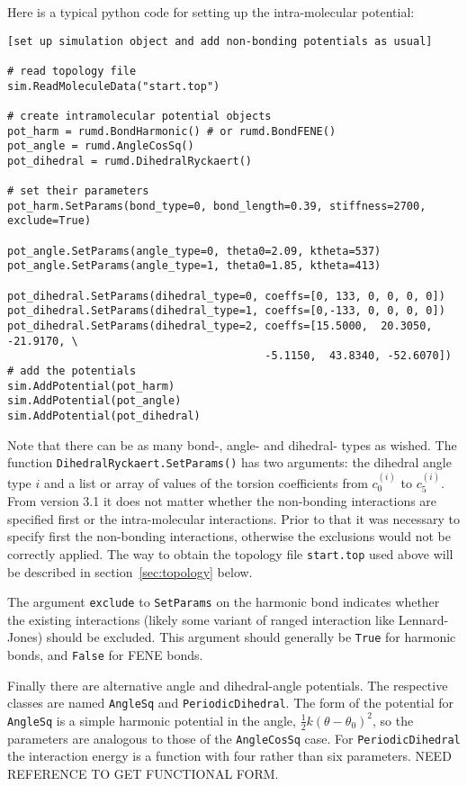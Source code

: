 \documentclass[a4paper]{article}
\begin{document}
Here is a typical python code for setting up the intra-molecular potential:
\begin{verbatim}
[set up simulation object and add non-bonding potentials as usual]

# read topology file
sim.ReadMoleculeData("start.top")

# create intramolecular potential objects
pot_harm = rumd.BondHarmonic() # or rumd.BondFENE()
pot_angle = rumd.AngleCosSq()
pot_dihedral = rumd.DihedralRyckaert()

# set their parameters
pot_harm.SetParams(bond_type=0, bond_length=0.39, stiffness=2700, exclude=True)

pot_angle.SetParams(angle_type=0, theta0=2.09, ktheta=537)
pot_angle.SetParams(angle_type=1, theta0=1.85, ktheta=413)

pot_dihedral.SetParams(dihedral_type=0, coeffs=[0, 133, 0, 0, 0, 0])
pot_dihedral.SetParams(dihedral_type=1, coeffs=[0,-133, 0, 0, 0, 0])
pot_dihedral.SetParams(dihedral_type=2, coeffs=[15.5000,  20.3050, -21.9170, \
                                        -5.1150,  43.8340, -52.6070])
# add the potentials
sim.AddPotential(pot_harm)
sim.AddPotential(pot_angle)
sim.AddPotential(pot_dihedral)
\end{verbatim}
Note that there can be as many bond-, angle- and dihedral- types as wished. The function \verb|DihedralRyckaert.SetParams()| has two arguments: the dihedral angle type $i$ and a list or array of values of the torsion coefficients from $c_0^{(i)}$ to $c_5^{(i)}$. From version 3.1 it does not matter whether the non-bonding interactions are specified first or the intra-molecular interactions. Prior to that it was necessary to specify first the non-bonding interactions, otherwise the exclusions would not be correctly applied. The way to obtain the topology file \verb|start.top| used above will be described in section~\ref{sec:topology}
below.

The argument \verb|exclude| to \verb|SetParams| on the harmonic bond indicates whether the existing interactions (likely some variant of ranged interaction like Lennard-Jones) should be excluded.  This argument should generally be \verb|True| for harmonic bonds, and \verb|False| for FENE bonds.

Finally there are alternative angle and dihedral-angle potentials. The respective classes are named \verb|AngleSq| and \verb|PeriodicDihedral|. The form of the potential for  \verb|AngleSq| is a simple harmonic potential in the angle, ${\textstyle \frac{1}{2}} k (\theta-\theta_0)^2$, so the parameters are analogous to those of the \verb|AngleCosSq| case. For \verb|PeriodicDihedral| the interaction energy is a function with four rather than six parameters. NEED REFERENCE TO GET FUNCTIONAL FORM.
\end{document}
